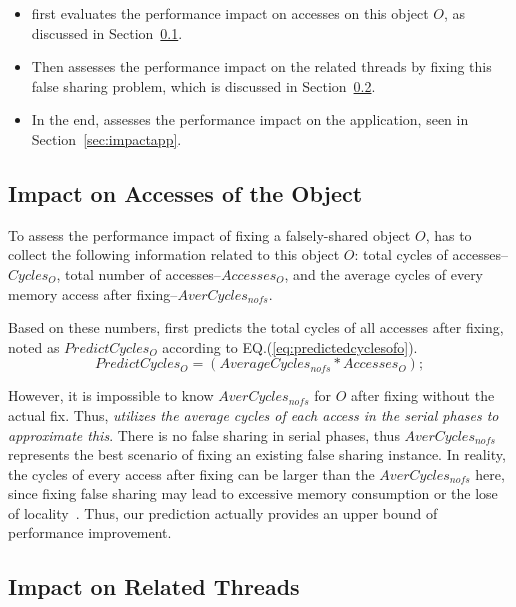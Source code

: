 \begin{itemize}
\item \cheetah{} first evaluates the performance impact on accesses on this object $O$, as discussed in Section~\ref{sec:impactobject}. 

\item Then \cheetah{} assesses the performance impact on the related threads by fixing this false sharing problem, which is discussed in Section~\ref{sec:impactthread}. 
 
\item In the end, \cheetah{} assesses the performance impact on the application, seen in Section~\ref{sec:impactapp}. 
\end{itemize}


\subsection{Impact on Accesses of the Object}
\label{sec:impactobject}

To assess the performance impact of fixing a falsely-shared object $O$, \cheetah{} has to collect the following information related to this object $O$:  total cycles of accesses-- $Cycles_O$, total number of accesses--$Accesses_O$, and the average cycles of every memory access after fixing--$AverCycles_{nofs}$.

Based on these numbers, \cheetah{} first predicts the total cycles of all accesses after fixing, noted as $PredictCycles_{O}$ according to EQ.(\ref{eq:predictedcyclesofo}).   
\begin{equation}
\label{eq:predictedcyclesofo}
 PredictCycles_{O} = (AverageCycles_{nofs} * Accesses_O);
\end{equation} 

However, it is impossible to know $AverCycles_{nofs}$ for $O$ after fixing without the actual fix. Thus, {\it \cheetah{} utilizes the average cycles of each access in the serial phases to approximate this}. There is no false sharing in serial phases, thus $AverCycles_{nofs}$ represents the best scenario of fixing an existing false sharing instance. In reality, the cycles of every access after fixing can be larger than the $AverCycles_{nofs}$ here, since fixing false sharing may lead to excessive memory consumption or the lose of locality~\cite{qinzhao}. Thus, our prediction actually provides an upper bound of performance improvement. 
 
\subsection{Impact on Related Threads}
\label{sec:impactthread}

